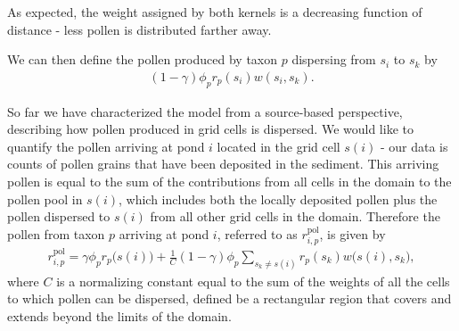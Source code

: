 \documentclass[12pt]{article}
\begin{document}
As expected, the weight assigned by both kernels is a decreasing function
of distance - less pollen is distributed farther away.

 
We can then define the pollen produced by taxon $p$ dispersing from
$s_i$ to $s_k$ by
\begin{align}
(1-\gamma) \phi_p r_p(s_i) w(s_i, s_k).
\end{align}




So far we have characterized the model from a source-based
perspective, describing how pollen produced in grid cells is
dispersed. We would like to quantify the pollen arriving at pond $i$
located in the grid cell $s(i)$ - our data is counts of pollen grains
that have been deposited in the sediment. This arriving pollen is
equal to the sum of the contributions from all cells in the domain to
the pollen pool in $s(i)$, which includes both the locally deposited
pollen plus the pollen dispersed to $s(i)$ from all other grid cells
in the domain. Therefore the pollen from taxon $p$ arriving at pond
$i$, referred to as $r_{i,p}^{\text{pol}}$, is given by
\begin{align}
r_{i,p}^{\text{pol}} = \gamma \phi_p r_p\bigl(s(i)\bigr) + \frac{1}{C} (1-\gamma) \phi_p \sum_{s_k \neq s(i) } r_p(s_k) w\bigl(s(i), s_k\bigr),
\label{eq:arriving}
\end{align}
where $C$ is a normalizing constant equal to the sum of the weights of
all the cells to which pollen can be dispersed, defined be a
rectangular region that covers and extends beyond the limits of the
domain.
\end{document}

